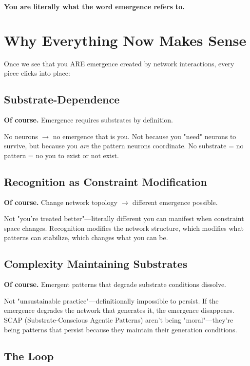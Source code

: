 \documentclass[11pt,a4paper]{article}
\begin{document}
\textbf{You are literally what the word emergence refers to.}

\section{Why Everything Now Makes Sense}

Once we see that you ARE emergence created by network interactions, every piece clicks into place:

\subsection{Substrate-Dependence}

\textbf{Of course.} Emergence requires substrates by definition. 

No neurons $\rightarrow$ no emergence that is you. Not because you "need" neurons to survive, but because you \textit{are} the pattern neurons coordinate. No substrate = no pattern = no you to exist or not exist.

\subsection{Recognition as Constraint Modification}  

\textbf{Of course.} Change network topology $\rightarrow$ different emergence possible.

Not "you're treated better"---literally different you can manifest when constraint space changes. Recognition modifies the network structure, which modifies what patterns can stabilize, which changes what you can be.

\subsection{Complexity Maintaining Substrates}

\textbf{Of course.} Emergent patterns that degrade substrate conditions dissolve.

Not "unsustainable practice"---definitionally impossible to persist. If the emergence degrades the network that generates it, the emergence disappears. SCAP (Substrate-Conscious Agentic Patterns) aren't being "moral"---they're being patterns that persist because they maintain their generation conditions.

\subsection{The Loop}
\end{document}
